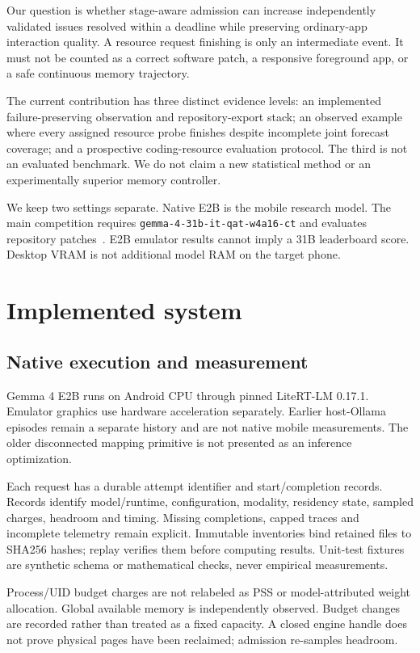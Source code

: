 \documentclass[10pt,twocolumn]{article}
\begin{document}
Our question is whether stage-aware admission can increase independently
validated issues resolved within a deadline while preserving ordinary-app
interaction quality. A resource request finishing is only an intermediate event.
It must not be counted as a correct software patch, a responsive foreground app,
or a safe continuous memory trajectory.

The current contribution has three distinct evidence levels: an implemented
failure-preserving observation and repository-export stack; an observed example
where every assigned resource probe finishes despite incomplete joint forecast
coverage; and a prospective coding-resource evaluation protocol. The third is
not an evaluated benchmark. We do not claim a new statistical method or an
experimentally superior memory controller.

We keep two settings separate. Native E2B is the mobile research model. The main
competition requires \texttt{gemma-4-31b-it-qat-w4a16-ct} and evaluates repository
patches~\cite{competition}. E2B emulator results cannot imply a 31B leaderboard
score. Desktop VRAM is not additional model RAM on the target phone.

\section{Implemented system}
\subsection{Native execution and measurement}
Gemma 4 E2B runs on Android CPU through pinned LiteRT-LM 0.17.1. Emulator graphics
use hardware acceleration separately. Earlier host-Ollama episodes remain a
separate history and are not native mobile measurements. The older disconnected
mapping primitive is not presented as an inference optimization.

Each request has a durable attempt identifier and start/completion records.
Records identify model/runtime, configuration, modality, residency state, sampled
charges, headroom and timing. Missing completions, capped traces and incomplete
telemetry remain explicit. Immutable inventories bind retained files to SHA256
hashes; replay verifies them before computing results. Unit-test fixtures are
synthetic schema or mathematical checks, never empirical measurements.

Process/UID budget charges are not relabeled as PSS or model-attributed weight
allocation. Global available memory is independently observed. Budget changes are
recorded rather than treated as a fixed capacity. A closed engine handle does not
prove physical pages have been reclaimed; admission re-samples headroom.
\end{document}
